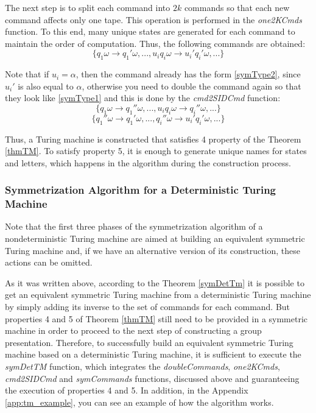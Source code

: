 \documentclass[conference]{IEEEtran}
\theoremstyle{definition}
\begin{document}
The next step is to split each command into $ 2k $ commands so that each new command affects only one tape. This operation is performed in the \textit{one2KCmds} function. To this end, many unique states are generated for each command to maintain the order of computation. Thus, the following commands are obtained:
$$\{ q_1 \omega \to q_1' \omega , ... , u_i q_i \omega \to u_i' q_i' \omega , ... \}$$

Note that if $ u_i = \alpha $, then the command already has the form \eqref{symType2}, since $ u_i '$ is also equal to $\alpha $, otherwise you need to double the command again so that they look like \eqref{symType1} and this is done by the \textit{cmd2SIDCmd} function:
$$\{ q_1 \omega \to q_1'' \omega , ... , u_i q_i \omega \to q_i'' \omega , ... \}$$
$$\{ q_1'' \omega \to q_1' \omega , ... , q_i'' \omega \to u_i' q_i' \omega , ... \}$$

Thus, a Turing machine is constructed that satisfies 4 property of the Theorem \ref{thmTM}. To satisfy property 5, it is enough to generate unique names for states and letters, which happens in the algorithm during the construction process.

\subsubsection{Symmetrization Algorithm for a Deterministic Turing Machine}

Note that the first three phases of the symmetrization algorithm of a nondeterministic Turing machine are aimed at building an equivalent symmetric Turing machine and, if we have an alternative version of its construction, these actions can be omitted.

As it was written above, according to the Theorem \ref{symDetTm} it is possible to get an equivalent symmetric Turing machine from a deterministic Turing machine by simply adding its inverse to the set of commands for each command. But properties 4 and 5 of Theorem \ref{thmTM} still need to be provided in a symmetric machine in order to proceed to the next step of constructing a group presentation.
Therefore, to successfully build an equivalent symmetric Turing machine based on a deterministic Turing machine, it is sufficient to execute the \textit{symDetTM} function, which integrates the \textit{doubleCommands}, \textit{one2KCmds}, \textit{cmd2SIDCmd} and \textit{symCommands} functions, discussed above and guaranteeing the execution of properties 4 and 5. In addition, in the Appendix \ref{app:tm_example}, you can see an example of how the algorithm works.
\end{document}
